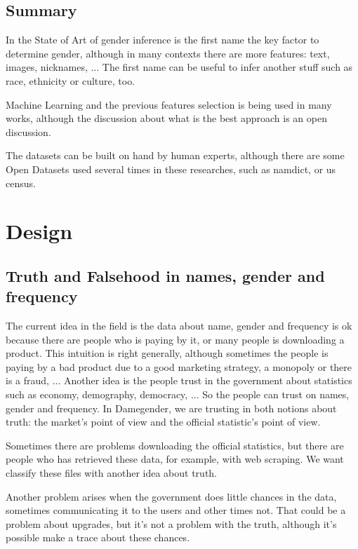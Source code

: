 \documentclass[a4paper]{article}
\begin{document}
\subsection{Summary}

In the State of Art of gender inference is the first name the key
factor to determine gender, although in many contexts there are more
features: text, images, nicknames, ... The first name can be useful to
infer another stuff such as race, ethnicity or culture, too.

Machine Learning and the previous features selection is being used in
many works, although the discussion about what is the best approach is
an open discussion.

The datasets can be built on hand by human experts, although there are
some Open Datasets used several times in these researches, such as
namdict, or us census.

\section{Design}
\label{sec:design}

\subsection{Truth and Falsehood in names, gender and frequency}
\label{sec:truthandfalsehood}

The current idea in the field is the data about name, gender and
frequency is ok because there are people who is paying by it, or many
people is downloading a product. This intuition is right generally,
although sometimes the people is paying by a bad product due to a good
marketing strategy, a monopoly or there is a fraud, ... Another idea
is the people trust in the government about statistics such as economy,
demography, democracy, ... So the people can trust on names, gender
and frequency. In Damegender, we are trusting in both notions about
truth: the market's point of view and the official statistic's
point of view.

Sometimes there are problems downloading the official statistics, but
there are people who has retrieved these data, for example, with
web scraping. We want classify these files with another idea about
truth.

Another problem arises when the government does little chances in the
data, sometimes communicating it to the users and other times
not. That could be a problem about upgrades, but it's not a problem
with the truth, although it's possible make a trace about these
chances.
\end{document}
